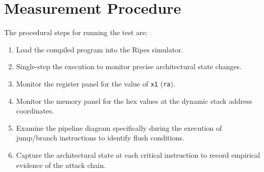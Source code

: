 \section{Measurement Procedure}
The procedural steps for running the test are:
\begin{enumerate}
    \item Load the compiled program into the Ripes simulator.
    \item Single-step the execution to monitor precise architectural state changes.
    \item Monitor the register panel for the value of \texttt{x1} (\texttt{ra}).
    \item Monitor the memory panel for the hex values at the dynamic stack address coordinates.
    \item Examine the pipeline diagram specifically during the execution of jump/branch instructions to identify flush conditions.
    \item Capture the architectural state at each critical instruction to record empirical evidence of the attack chain.
\end{enumerate}
